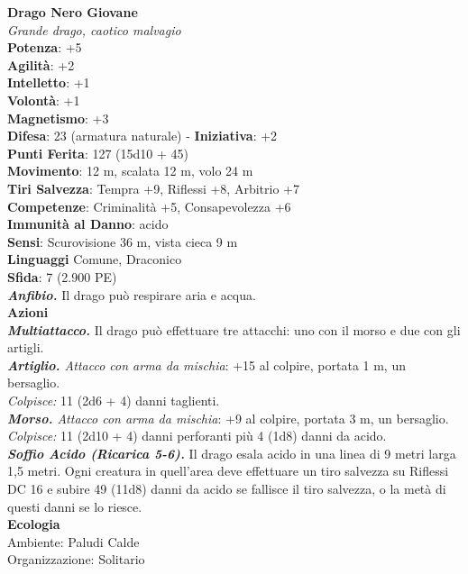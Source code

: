 \begin{multicols}{2}
\medskip\textbf{Drago Nero Giovane}\\
\emph{Grande drago, caotico malvagio}\\
\textbf{Potenza}: +5\\
\textbf{Agilità}: +2\\
\textbf{Intelletto}: +1\\
\textbf{Volontà}: +1\\
\textbf{Magnetismo}: +3\\
\textbf{Difesa}: 23 (armatura naturale) - \textbf{Iniziativa}: +2\\
\textbf{Punti Ferita}: 127 (15d10 + 45)\\
\textbf{Movimento}: 12 m, scalata 12 m, volo 24 m\\
\textbf{Tiri Salvezza}: Tempra +9, Riflessi +8, Arbitrio +7\\
\textbf{Competenze}: Criminalità +5, Consapevolezza +6\\
\textbf{Immunità al Danno}: acido\\
\textbf{Sensi}: Scurovisione 36 m, vista cieca 9 m\\
\textbf{Linguaggi} Comune, Draconico\\
\textbf{Sfida}: 7 (2.900 PE)\smallskip\\
\emph{\textbf{Anfibio.}} Il drago può respirare aria e acqua.\\
\smallskip\textbf{Azioni}\\
\emph{\textbf{Multiattacco.}} Il drago può effettuare tre attacchi: uno con il morso e due con gli artigli.\\
\emph{\textbf{Artiglio.} Attacco con arma da mischia}: +15 al colpire, portata 1 m, un bersaglio.\\
\emph{Colpisce:} 11 (2d6 + 4) danni taglienti.\\
\emph{\textbf{Morso.} Attacco con arma da mischia}: +9 al colpire, portata 3 m, un bersaglio.\\
\emph{Colpisce:} 11 (2d10 + 4) danni perforanti più 4 (1d8) danni da acido.\\
\emph{\textbf{Soffio Acido (Ricarica 5-6).}} Il drago esala acido in una linea di 9 metri larga 1,5 metri. Ogni creatura in quell'area deve effettuare un tiro salvezza su Riflessi DC  16 e subire 49 (11d8) danni da acido se fallisce il tiro salvezza, o la metà di questi danni se lo riesce.\\
\textbf{Ecologia}\\
Ambiente: Paludi Calde\\
Organizzazione: Solitario\\

\end{multicols}
